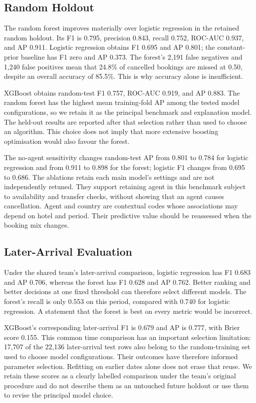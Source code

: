 \subsection{Random Holdout}
The random forest improves materially over logistic regression in the retained random holdout. Its F1 is 0.795, precision 0.843, recall 0.752, ROC-AUC 0.937, and AP 0.911. Logistic regression obtains F1 0.695 and AP 0.801; the constant-prior baseline has F1 zero and AP 0.373. The forest's 2,191 false negatives and 1,240 false positives mean that 24.8\% of cancelled bookings are missed at 0.50, despite an overall accuracy of 85.5\%. This is why accuracy alone is insufficient.

XGBoost obtains random-test F1 0.757, ROC-AUC 0.919, and AP 0.883. The random forest has the highest mean training-fold AP among the tested model configurations, so we retain it as the principal benchmark and explanation model. The held-out results are reported after that selection rather than used to choose an algorithm. This choice does not imply that more extensive boosting optimisation would also favour the forest.

The no-agent sensitivity changes random-test AP from 0.801 to 0.784 for logistic regression and from 0.911 to 0.898 for the forest; logistic F1 changes from 0.695 to 0.686. The ablations retain each main model's settings and are not independently retuned. They support retaining agent in this benchmark subject to availability and transfer checks, without showing that an agent causes cancellation. Agent and country are contextual codes whose associations may depend on hotel and period. Their predictive value should be reassessed when the booking mix changes.

\subsection{Later-Arrival Evaluation}
Under the shared team's later-arrival comparison, logistic regression has F1 0.683 and AP 0.706, whereas the forest has F1 0.628 and AP 0.762. Better ranking and better decisions at one fixed threshold can therefore select different models. The forest's recall is only 0.553 on this period, compared with 0.740 for logistic regression. A statement that the forest is best on every metric would be incorrect.

XGBoost's corresponding later-arrival F1 is 0.679 and AP is 0.777, with Brier score 0.155. This common time comparison has an important selection limitation: 17,707 of the 22,136 later-arrival test rows also belong to the random-training set used to choose model configurations. Their outcomes have therefore informed parameter selection. Refitting on earlier dates alone does not erase that reuse. We retain these scores as a clearly labelled comparison under the team's original procedure and do not describe them as an untouched future holdout or use them to revise the principal model choice.

